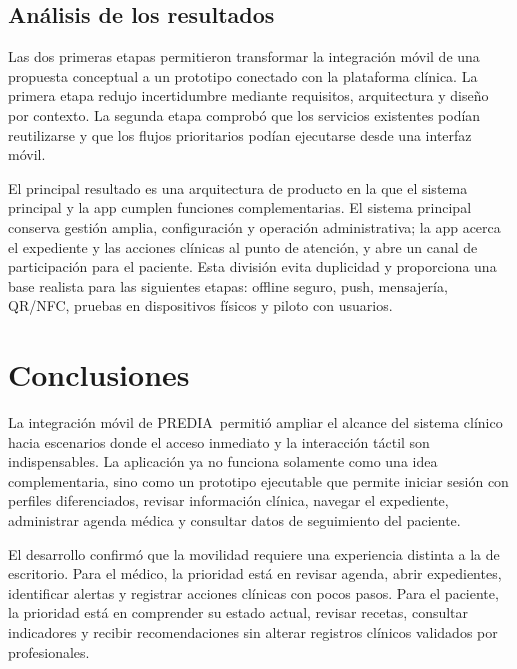 \documentclass[12pt,letterpaper]{report}
\newcommand{\projectname}{PREDIA}
\begin{document}
\section{Análisis de los resultados}

Las dos primeras etapas permitieron transformar la integración móvil de una propuesta conceptual a un prototipo conectado con la plataforma clínica. La primera etapa redujo incertidumbre mediante requisitos, arquitectura y diseño por contexto. La segunda etapa comprobó que los servicios existentes podían reutilizarse y que los flujos prioritarios podían ejecutarse desde una interfaz móvil.

El principal resultado es una arquitectura de producto en la que el sistema principal y la app cumplen funciones complementarias. El sistema principal conserva gestión amplia, configuración y operación administrativa; la app acerca el expediente y las acciones clínicas al punto de atención, y abre un canal de participación para el paciente. Esta división evita duplicidad y proporciona una base realista para las siguientes etapas: offline seguro, push, mensajería, QR/NFC, pruebas en dispositivos físicos y piloto con usuarios.

\chapter{Conclusiones}

La integración móvil de \projectname\ permitió ampliar el alcance del sistema clínico hacia escenarios donde el acceso inmediato y la interacción táctil son indispensables. La aplicación ya no funciona solamente como una idea complementaria, sino como un prototipo ejecutable que permite iniciar sesión con perfiles diferenciados, revisar información clínica, navegar el expediente, administrar agenda médica y consultar datos de seguimiento del paciente.

El desarrollo confirmó que la movilidad requiere una experiencia distinta a la de escritorio. Para el médico, la prioridad está en revisar agenda, abrir expedientes, identificar alertas y registrar acciones clínicas con pocos pasos. Para el paciente, la prioridad está en comprender su estado actual, revisar recetas, consultar indicadores y recibir recomendaciones sin alterar registros clínicos validados por profesionales.
\end{document}
